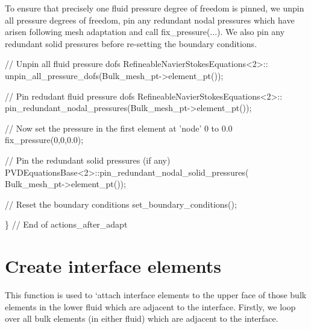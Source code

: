 To ensure that precisely one fluid pressure degree of freedom is pinned, we unpin all pressure degrees of freedom, pin any redundant nodal pressures which have arisen following mesh adaptation and call {\ttfamily fix\+\_\+pressure}(...). We also pin any redundant solid pressures before re-\/setting the boundary conditions.


\begin{DoxyCodeInclude}
 \textcolor{comment}{// Unpin all fluid pressure dofs}
 RefineableNavierStokesEquations<2>::
  unpin\_all\_pressure\_dofs(Bulk\_mesh\_pt->element\_pt());
 
 \textcolor{comment}{// Pin redudant fluid pressure dofs}
 RefineableNavierStokesEquations<2>::
  pin\_redundant\_nodal\_pressures(Bulk\_mesh\_pt->element\_pt());
 
 \textcolor{comment}{// Now set the pressure in the first element at 'node' 0 to 0.0}
 fix\_pressure(0,0,0.0);
 
 \textcolor{comment}{// Pin the redundant solid pressures (if any)}
 PVDEquationsBase<2>::pin\_redundant\_nodal\_solid\_pressures(
  Bulk\_mesh\_pt->element\_pt());

 \textcolor{comment}{// Reset the boundary conditions}
 set\_boundary\_conditions();

\} \textcolor{comment}{// End of actions\_after\_adapt}

\end{DoxyCodeInclude}




 

\hypertarget{index_create_interface_elements}{}\section{Create interface elements}\label{index_create_interface_elements}
This function is used to `attach\textquotesingle{} interface elements to the upper face of those bulk elements in the lower fluid which are adjacent to the interface. Firstly, we loop over all bulk elements (in either fluid) which are adjacent to the interface.


